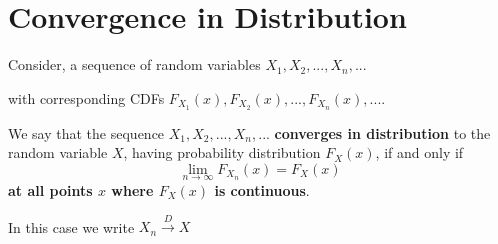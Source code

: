 \documentclass[notes=show,smaller,handout]{beamer}\usepackage[]{graphicx}\usepackage[]{color}
\renewcommand{\Pr}{P}
\newenvironment{stepitemize}{\begin{itemize}[<+->]}{\end{itemize} }
\begin{document}
%
%
%
%
%
%
%
%
%
%

\section{Convergence in Distribution}

\begin{frame}{\secname}
  \begin{definition}
  Consider, a sequence of random variables $X_{1},X_{2},...,X_{n},...$

  \medskip

  with corresponding CDFs $F_{X_{1}}\left( x\right) ,F_{X_{2}}\left( x\right),...,F_{X_{n}}\left(x\right) ,...$.

  \bigskip

  We say that the sequence $X_{1},X_{2},...,X_{n},...$ \textbf{converges in distribution} to the random variable $X$, having probability distribution $F_X(x)$, if and only if
  \begin{equation*}
  \lim_{n\rightarrow \infty }F_{X_n}\left( x\right) =F_{X}\left( x\right)
  \end{equation*}
  \textbf{at all points $x$ where $F_{X}\left( x\right) $ is continuous}.

  \medskip

  In this case we write $X_{n}\overset{D}{\rightarrow }X$
  \end{definition}
\end{frame}
\end{document}
